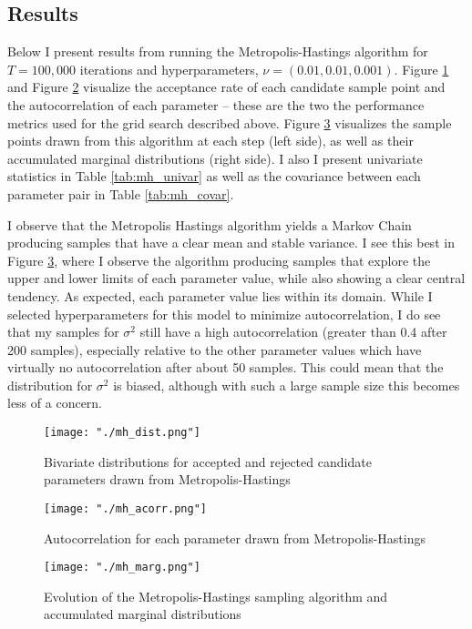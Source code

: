 \documentclass{article}
\begin{document}
\subsection{Results}
Below I present results from running the Metropolis-Hastings algorithm for $T=100,000$ iterations and hyperparameters, $\nu = (0.01, 0.01, 0.001)$. Figure \ref{fig:mh_dist} and Figure \ref{fig:mh_acorr} visualize the acceptance rate of each candidate sample point and the autocorrelation of each parameter -- these are the two the performance metrics used for the grid search described above. Figure \ref{fig:mh_marg} visualizes the sample points drawn from this algorithm at each step (left side), as well as their accumulated marginal distributions (right side). I also I present univariate statistics in Table \ref{tab:mh_univar} as well as the covariance between each parameter pair in Table \ref{tab:mh_covar}. 

I observe that the Metropolis Hastings algorithm yields a Markov Chain producing samples that have a clear mean and stable variance. I see this best in Figure \ref{fig:mh_marg}, where I observe the algorithm producing samples that explore the upper and lower limits of each parameter value, while also showing a clear central tendency. As expected, each parameter value lies within its domain. While I selected hyperparameters for this model to minimize autocorrelation, I do see that my samples for $\sigma^2$ still have a high autocorrelation (greater than 0.4 after 200 samples), especially relative to the other parameter values which have virtually no autocorrelation after about 50 samples. This could mean that the distribution for $\sigma^2$ is biased, although with such a large sample size this becomes less of a concern. 

\begin{figure}[H]
  \centering
  \texttt{[image: "./mh\_dist.png"]}
  \caption{\label{fig:mh_dist} Bivariate distributions for accepted and rejected candidate parameters drawn from Metropolis-Hastings}
\end{figure}

\begin{figure}[H]
  \centering
  \texttt{[image: "./mh\_acorr.png"]}
  \caption{\label{fig:mh_acorr} Autocorrelation for each parameter drawn from Metropolis-Hastings}
\end{figure}

\begin{figure}[H]
  \centering
  \texttt{[image: "./mh\_marg.png"]}
  \caption{\label{fig:mh_marg} Evolution of the Metropolis-Hastings sampling algorithm and accumulated marginal distributions}
\end{figure}
\end{document}
